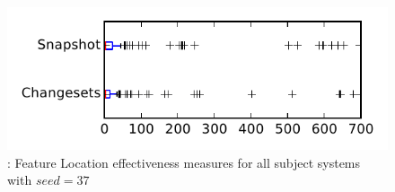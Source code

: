 
\begin{figure}
\centering
\includegraphics[height=0.4\textheight]{figures/flt_seed/rq1_tiny_37}
\caption{\rone: Feature Location effectiveness measures for all subject systems with $seed=37$}
\label{fig:flt_seed:rq1:tiny}
\end{figure}
